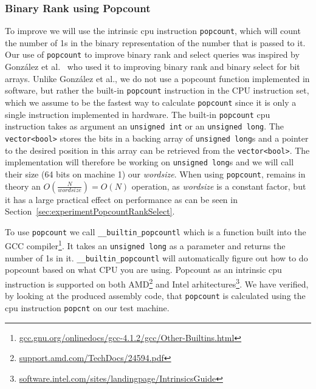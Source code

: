 \subsubsection{Binary Rank using Popcount}
\label{sec:popcountBinaryRank}
To improve  we will use the intrinsic cpu instruction \texttt{popcount}, which will count the number of 1s in the binary representation of the number that is passed to it.
Our use of \texttt{popcount} to improve binary rank and select queries was inspired by~ González et al.~ who used it to improving binary rank and binary select for bit arrays.
Unlike González et al., we do not use a popcount function implemented in software, but rather the built-in \texttt{popcount} instruction in the CPU instruction set, which we assume to be the fastest way to calculate \texttt{popcount} since it is only a single instruction implemented in hardware.
The built-in \texttt{popcount} cpu instruction takes as argument an \texttt{unsigned int} or an \texttt{unsigned long}.
The \texttt{vector<bool>} stores the bits in a backing array of \texttt{unsigned long}s and a pointer to the desired position in this array can be retrieved from the \texttt{vector<bool>}.
The implementation will therefore be working on \texttt{unsigned long}s and we will call their size (64 bits on machine 1) our \textit{wordsize}.
When using \texttt{popcount},  remains in theory an $O(\frac{N}{\mathit{wordsize}}) = O(N)$ operation, as \textit{wordsize} is a constant factor, but it has a large practical effect on performance as can be seen in Section~\ref{sec:experimentPopcountRankSelect}.

To use \texttt{popcount} we call \texttt{\_\_builtin\_popcountl} which is a function built into the GCC compiler\footnote{\url{gcc.gnu.org/onlinedocs/gcc-4.1.2/gcc/Other-Builtins.html}}. 
It takes an \texttt{unsigned long} as a parameter and returns the number of 1s in it. \texttt{\_\_builtin\_popcountl} will automatically figure out how to do popcount based on what CPU you are using. Popcount as an intrinsic cpu instruction is supported on both AMD\footnote{\url{support.amd.com/TechDocs/24594.pdf}} and Intel arhitectures\footnote{\url{software.intel.com/sites/landingpage/IntrinsicsGuide}}.
We have verified, by looking at the produced assembly code, that \texttt{popcount} is calculated using the cpu instruction \texttt{popcnt} on our test machine.
	

